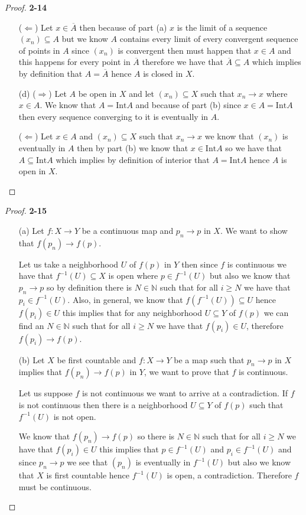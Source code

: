 \documentclass[11pt]{article}
\newcommand{\N}{\mathbb{N}}
\newcommand{\inter}{\text{Int}}
\theoremstyle{definition}
\begin{document}
\begin{proof}{\textbf{2-14}}
\begin{itemize}
    ($\Leftarrow$) Let $x \in \overline{A}$ then because of part (a) $x$ is the
    limit of a sequence $(x_n) \subseteq A$ but we know $A$ contains every
    limit of every convergent sequence of points in $A$ since $(x_n)$ is
    convergent then must happen that $x \in A$ and this happens for every
    point in $\overline{A}$ therefore we have that $ \overline{A} \subseteq A$
    which implies by definition that $A = \overline{A}$ hence $A$ is closed in
    $X$.

    \item [(d)] ($\Rightarrow$) Let $A$ be open in $X$ and let
    $(x_n) \subseteq X$ such that $x_n \to x$ where $x \in A$. We know that
    $A = \inter A$ and because of part (b) since $x \in A = \inter A$ then
    every sequence converging to it is eventually in $A$.
    
    ($\Leftarrow$) Let $x \in A$ and $(x_n)\subseteq X$ such that $x_n \to x$
    we know that $(x_n)$ is eventually in $A$ then by part (b) we know that 
    $x \in \inter A$ so we have that $A \subseteq \inter A$ which implies
    by definition of interior that $A = \inter A$ hence $A$ is open in $X$. 
\end{itemize}
\end{proof}
\begin{proof}{\textbf{2-15}}
\begin{itemize}
    \item [(a)] Let $f:X \to Y$ be a continuous map and $p_n \to p$ in $X$.
    We want to show that $f(p_n) \to f(p)$.

    Let us take a neighborhood $U$ of $f(p)$ in $Y$ then since $f$ is continuous
    we have that $f^{-1}(U) \subseteq X$ is open where $p \in f^{-1}(U)$
    but also we know that $p_n \to p$ so by definition there is $N \in \N$
    such that for all $i \geq N$ we have that $p_i \in f^{-1}(U)$.
    Also, in general, we know that $f(f^{-1}(U)) \subseteq U$ hence
    $f(p_i) \in U$ this implies that for any neighborhood $U \subseteq Y$
    of $f(p)$ we can find an $N \in \N$ such that for all $i \geq N$ we have
    that $f(p_i) \in U$, therefore $f(p_i) \to f(p)$.

    \item [(b)] Let $X$ be first countable and $f: X \to Y$ be a map such that
    $p_n \to p$ in $X$ implies that $f(p_n) \to f(p)$ in $Y$,
    we want to prove that $f$ is continuous.

    Let us suppose $f$ is not continuous we want to arrive at a contradiction.
    If $f$ is not continuous then there is a neighborhood $U \subseteq Y$ of
    $f(p)$ such that  $f^{-1}(U)$ is not open.

    We know that $f(p_n) \to f(p)$ so there is $N \in \N$ such that for all
    $i \geq N$ we have that $f(p_i) \in U$ this implies that
    $p \in f^{-1}(U)$ and $p_i \in f^{-1}(U)$ and since $p_n \to p$
    we see that $(p_n)$ is eventually in $f^{-1}(U)$ but also we know that
    $X$ is first countable hence $f^{-1}(U)$ is open, a contradiction.
    Therefore $f$ must be continuous.
\end{itemize}
\end{proof}
\end{document}
